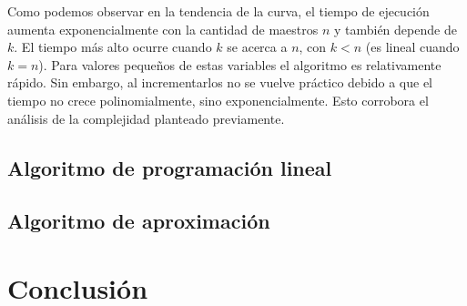 \documentclass{article}
\begin{document}
Como podemos observar en la tendencia de la curva, el tiempo de ejecución aumenta exponencialmente con la cantidad de maestros $n$ y también depende de $k$. El tiempo más alto ocurre cuando $k$ se acerca a $n$, con $k < n$ (es lineal cuando $k = n$). Para valores pequeños de estas variables el algoritmo es relativamente rápido. Sin embargo, al incrementarlos no se vuelve práctico debido a que el tiempo no crece polinomialmente, sino exponencialmente.  Esto corrobora el análisis de la complejidad planteado previamente.

\subsection{Algoritmo de programación lineal}
\subsection{Algoritmo de aproximación}


\section{Conclusión}
\end{document}

